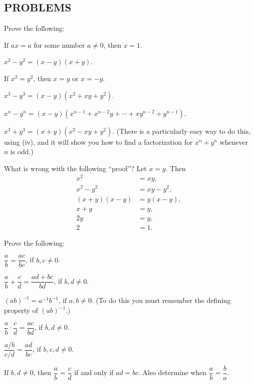 \subsection*{PROBLEMS}

 Prove the following:
\begin{romans}
\item If $ax = a$ for some number $a \neq 0$, then $x = 1$.
\item $x^2 - y^2 = (x-y)(x+y)$.
\item If $x^2 = y^2$, then $x = y$ or $x = -y$.
\item $x^3 - y^3 = (x-y)(x^2+xy+y^2)$.
\item $x^n - y^n = (x-y)(x^{n-1} + x^{n-2}y + \cdots + xy^{n-2} + y^{n-1})$.
\item $x^3 + y^3 = (x+y)(x^2 - xy + y^2)$. (There is a particularly easy way
  to do this, using (iv), and it will show you how to find a factorization
  for $x^n + y^n$ whenever $n$ is odd.)
\end{romans}

 What is wrong with the following ``proof''? Let $x=y$. Then
\begin{align*}
x^2 &= xy,\\
x^2 - y^2 &= xy - y^2,\\
(x+y)(x-y) &= y(x-y),\\
x+y &= y,\\
2y &= y,\\
2 &= 1.
\end{align*}

 Prove the following:
\begin{romans}
\item $\dfrac{a}{b} = \dfrac{ac}{bc}$, if $b, c \neq 0$.
\item $\dfrac{a}{b} + \dfrac{c}{d} = \dfrac{ad + bc}{bd}$, if $b, d \neq 0$.
\item $(ab)^{-1} = a^{-1}b^{-1}$, if $a, b \neq 0$. (To do this you must
  remember the defining property of $(ab)^{-1}$.)
\item $\dfrac{a}{b} \cdot \dfrac{c}{d} = \dfrac{ac}{bd}$, if $b, d \neq 0$. %
\item $\dfrac{a/b}{c/d} = \dfrac{ad}{bc}$, if $b, c, d \neq 0$. %
\item If $b, d \neq 0$, then $\dfrac{a}{b} = \dfrac{c}{d}$ if and only if
  $ad = bc$. Also determine when $\dfrac{a}{b} = \dfrac{b}{a}$.
\end{romans}

